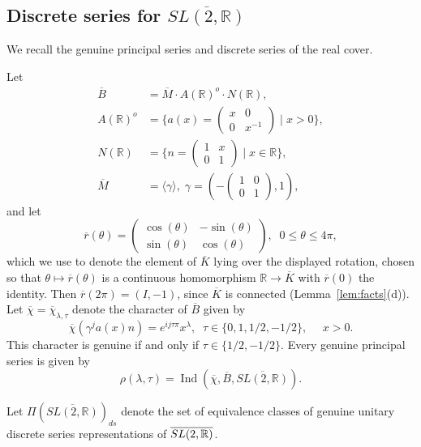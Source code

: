 \documentclass[12pt,letterpaper,openany]{book}
\theoremstyle{plain}
\theoremstyle{definition}
\theoremstyle{remark}
\theoremstyle{remark}
\begin{document}
\subsection{Discrete series for \texorpdfstring{$\overline{SL(2,\mathbb{R})}$}{SL(2,R)-bar}}

We recall the genuine principal series and discrete series of the real cover.


Let
\begin{align*}
\overline{B} &=\overline{M}\cdot A(\mathbb{R})^o\cdot N(\mathbb{R}), \\
A(\mathbb{R})^o &=\{a(x)=\left(
\begin{array}{cc}
x & 0 \\
0 & x^{-1}
\end{array}
\right) \;|\;x>0\}, \\
N(\mathbb{R}) &=\{n=\left(
\begin{array}{cc}
1 & x \\
0 & 1
\end{array}
\right) \;|\;x\in \mathbb{R}\}, \\
\overline{M} &=\langle\gamma\rangle,\;\gamma =(-\left(
\begin{array}{cc}
1 & 0 \\
0 & 1
\end{array}
\right) ,1),
\end{align*}
and let
\[
\overline{r}(\theta )=\left(
\begin{array}{cc}
\cos (\theta ) & -\sin (\theta ) \\
\sin (\theta ) & \cos (\theta )
\end{array}
\right) ,\;\;0\leq \theta \leq 4\pi ,
\]
which we use to denote the element of $\overline{K}$ lying over the
displayed rotation, chosen so that $\theta\mapsto\overline r(\theta)$ is a
continuous homomorphism ${\mathbb R}\rightarrow\overline K$ with
$\overline r(0)$ the identity. Then $\overline r(2\pi)=(I,-1)$, since
$\overline K$ is connected (Lemma~\ref{lem:facts}(d)).
Let $\overline{\chi }=\overline{\chi }_{\lambda ,\tau }$ denote the
character of $\overline{B}$ given by
\[
\overline{\chi }(\gamma ^ja(x)n)=e^{ij\tau \pi }x^\lambda ,\;\;\tau \in
\{0,1,1/2,-1/2\},\ \ \ \ \ \ x>0.
\]
This character is genuine if and only if $\tau \in \{1/2,-1/2\}$. Every
genuine principal series is given by
\[
\rho (\lambda ,\tau )=\operatorname{Ind}(\overline{\chi },\overline{B},\overline{SL(2,\mathbb{R%
})}).
\]

Let $\Pi (\overline{SL(2,\mathbb{R})})_{ds}$ denote the set of equivalence
classes of genuine unitary discrete series representations of $\overline{%
SL(2,\mathbb{R})}$.
\end{document}
